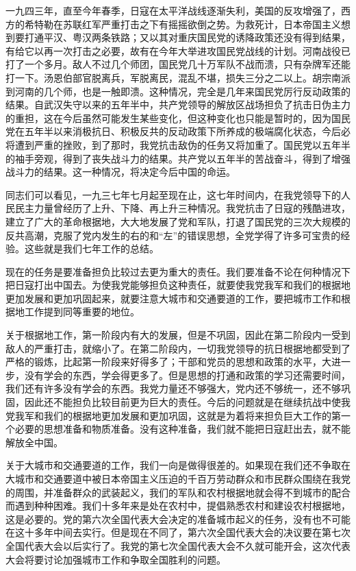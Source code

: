 一九四三年，直至今年春季，日寇在太平洋战线逐渐失利，美国的反攻增强了，西方的希特勒在苏联红军严重打击之下有摇摇欲倒之势。为救死计，日本帝国主义想到要打通平汉、粤汉两条铁路；又以其对重庆国民党的诱降政策还没有得到结果，有给它以再一次打击之必要，故有在今年大举进攻国民党战线的计划。河南战役已打了一个多月。敌人不过几个师团，国民党几十万军队不战而溃，只有杂牌军还能打一下。汤恩伯部官脱离兵，军脱离民，混乱不堪，损失三分之二以上。胡宗南派到河南的几个师，也是一触即溃。这种情况，完全是几年来国民党厉行反动政策的结果。自武汉失守以来的五年半中，共产党领导的解放区战场担负了抗击日伪主力的重担，这在今后虽然可能发生某些变化，但这种变化也只能是暂时的，因为国民党在五年半以来消极抗日、积极反共的反动政策下所养成的极端腐化状态，今后必将遭到严重的挫败，到了那时，我党抗击敌伪的任务又将加重了。国民党以五年半的袖手旁观，得到了丧失战斗力的结果。共产党以五年半的苦战奋斗，得到了增强战斗力的结果。这一种情况，将决定今后中国的命运。

同志们可以看见，一九三七年七月起至现在止，这七年时间内，在我党领导下的人民民主力量曾经历了上升、下降、再上升三种情况。我党抗击了日寇的残酷进攻，建立了广大的革命根据地，大大地发展了党和军队，打退了国民党的三次大规模的反共高潮，克服了党内发生的右的和“左”的错误思想，全党学得了许多可宝贵的经验。这些就是我们七年工作的总结。

现在的任务是要准备担负比较过去更为重大的责任。我们要准备不论在何种情况下把日寇打出中国去。为使我党能够担负这种责任，就要使我党我军和我们的根据地更加发展和更加巩固起来，就要注意大城市和交通要道的工作，要把城市工作和根据地工作提到同等重要的地位。

关于根据地工作，第一阶段内有大的发展，但是不巩固，因此在第二阶段内一受到敌人的严重打击，就缩小了。在第二阶段内，一切我党领导的抗日根据地都受到了严格的锻炼，比起第一阶段来好得多了；干部和党员的思想和政策的水平，大进一步，没有学会的东西，学会得更多了。但是思想的打通和政策的学习还需要时间，我们还有许多没有学会的东西。我党力量还不够强大，党内还不够统一，还不够巩固，因此还不能担负比较目前更为巨大的责任。今后的问题就是在继续抗战中使我党我军和我们的根据地更加发展和更加巩固，这就是为着将来担负巨大工作的第一个必要的思想准备和物质准备。没有这种准备，我们就不能把日寇赶出去，就不能解放全中国。

关于大城市和交通要道的工作，我们一向是做得很差的。如果现在我们还不争取在大城市和交通要道中被日本帝国主义压迫的千百万劳动群众和市民群众围绕在我党的周围，并准备群众的武装起义，我们的军队和农村根据地就会得不到城市的配合而遇到种种困难。我们十多年来是处在农村中，提倡熟悉农村和建设农村根据地，这是必要的。党的第六次全国代表大会决定的准备城市起义的任务，没有也不可能在这十多年中间去实行。但是现在不同了，第六次全国代表大会的决议要在第七次全国代表大会以后实行了。我党的第七次全国代表大会不久就可能开会，这次代表大会将要讨论加强城市工作和争取全国胜利的问题。


